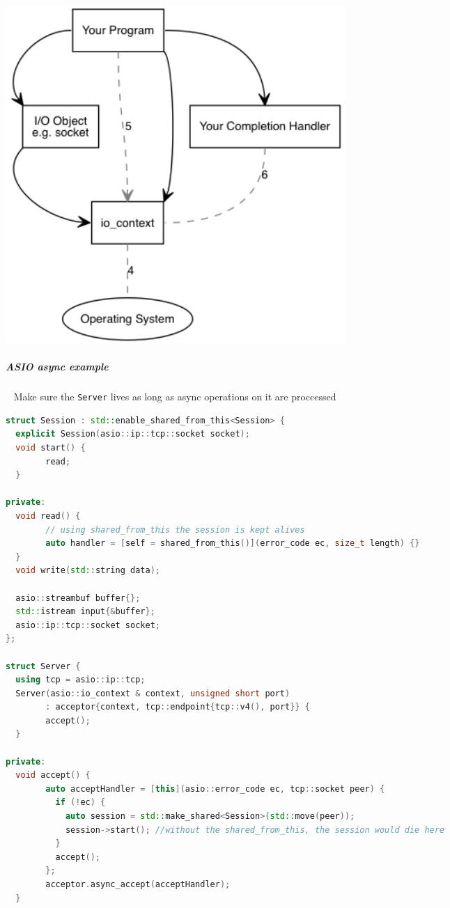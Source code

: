 \documentclass[11pt,twoside,landscape]{article}
\begin{document}
\begin{multicols}{2}
{
\begin{center}
\includegraphics[width=.9\linewidth]{img/async_operations_2.png}
\end{center}
\label{fig:asio-async-operations-part-2}
}
\subparagraph{ASIO async example} \
\label{sec:org57a677d}
Make sure the \texttt{Server} lives as long as async operations on it are proccessed

\begin{lstlisting}[language=c++,label=lst:async-example-using-asio,caption={Async Example using ASIO},captionpos=b,numbers=none]
struct Session : std::enable_shared_from_this<Session> {
  explicit Session(asio::ip::tcp::socket socket);
  void start() {
        read;
  }

private:
  void read() {
        // using shared_from_this the session is kept alives
        auto handler = [self = shared_from_this()](error_code ec, size_t length) {}
  }
  void write(std::string data);

  asio::streambuf buffer{};
  std::istream input{&buffer};
  asio::ip::tcp::socket socket;
};

struct Server {
  using tcp = asio::ip::tcp;
  Server(asio::io_context & context, unsigned short port)
        : acceptor{context, tcp::endpoint{tcp::v4(), port}} {
        accept();
  }

private:
  void accept() {
        auto acceptHandler = [this](asio::error_code ec, tcp::socket peer) {
          if (!ec) {
            auto session = std::make_shared<Session>(std::move(peer));
            session->start(); //without the shared_from_this, the session would die here
          }
          accept();
        };
        acceptor.async_accept(acceptHandler);
  }


\end{lstlisting}
\end{multicols}
\end{document}
